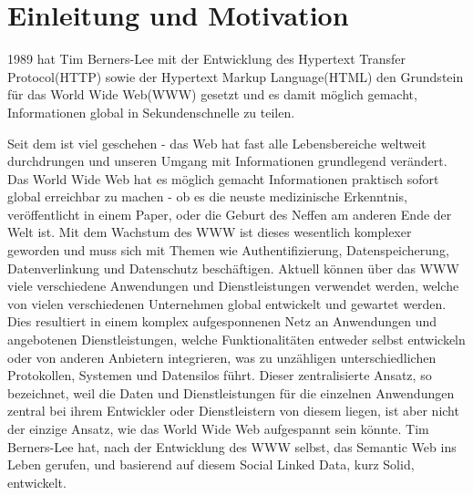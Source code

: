\documentclass[acmtog]{acmart}
\begin{document}
\section{Einleitung und Motivation}

1989 hat Tim Berners-Lee mit der Entwicklung des Hypertext Transfer Protocol(HTTP) sowie der Hypertext Markup Language(HTML) den Grundstein für das World Wide Web(WWW) gesetzt und es damit möglich gemacht, Informationen global in Sekundenschnelle zu teilen.\cite{birth-web}

Seit dem ist viel geschehen - das Web hat fast alle Lebensbereiche weltweit durchdrungen und unseren Umgang mit Informationen grundlegend verändert. Das World Wide Web hat es möglich gemacht Informationen praktisch sofort global erreichbar zu machen - ob es die neuste medizinische Erkenntnis, veröffentlicht in einem Paper, oder die Geburt des Neffen am anderen Ende der Welt ist. Mit dem Wachstum des WWW ist dieses wesentlich komplexer geworden und muss sich mit Themen wie Authentifizierung, Datenspeicherung, Datenverlinkung und Datenschutz beschäftigen. Aktuell können über das WWW viele verschiedene Anwendungen und Dienstleistungen verwendet werden, welche von vielen verschiedenen Unternehmen global entwickelt und gewartet werden. Dies resultiert in einem komplex aufgesponnenen Netz an Anwendungen und angebotenen Dienstleistungen, welche Funktionalitäten entweder selbst entwickeln oder von anderen Anbietern integrieren, was zu unzähligen unterschiedlichen Protokollen, Systemen und Datensilos führt. Dieser zentralisierte Ansatz, so bezeichnet, weil die Daten und Dienstleistungen für die einzelnen Anwendungen zentral bei ihrem Entwickler oder Dienstleistern von diesem liegen, ist aber nicht der einzige Ansatz, wie das World Wide Web aufgespannt sein könnte. 
Tim Berners-Lee hat, nach der Entwicklung des WWW selbst, das Semantic Web ins Leben gerufen, und basierend auf diesem Social Linked Data, kurz Solid, entwickelt.
\end{document}
